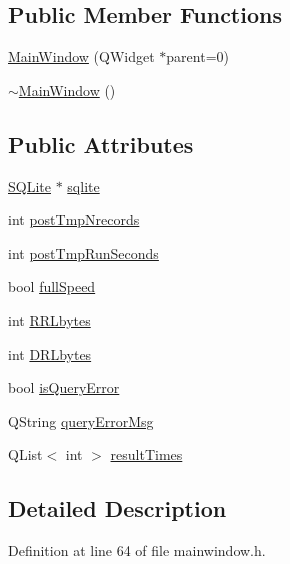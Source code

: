 \subsection*{\-Public \-Member \-Functions}
\begin{DoxyCompactItemize}
\item 
\hyperlink{classMainWindow_a8b244be8b7b7db1b08de2a2acb9409db}{\-Main\-Window} (\-Q\-Widget $\ast$parent=0)
\item 
\hyperlink{classMainWindow_ae98d00a93bc118200eeef9f9bba1dba7}{$\sim$\-Main\-Window} ()
\end{DoxyCompactItemize}
\subsection*{\-Public \-Attributes}
\begin{DoxyCompactItemize}
\item 
\hyperlink{classSQLite}{\-S\-Q\-Lite} $\ast$ \hyperlink{classMainWindow_acd9e528f003b22f3c17657a89505803a}{sqlite}
\item 
int \hyperlink{classMainWindow_a271013fd9b8f471aed5ce6ff2941a6cf}{post\-Tmp\-Nrecords}
\item 
int \hyperlink{classMainWindow_a6c309625ea8d8bd81d552a96ffbbf368}{post\-Tmp\-Run\-Seconds}
\item 
bool \hyperlink{classMainWindow_ac3f3016f1a0ad93767c521c2fd349c7b}{full\-Speed}
\item 
int \hyperlink{classMainWindow_ac4e4dd0ba3dd8b958d2aec2271bfe299}{\-R\-R\-Lbytes}
\item 
int \hyperlink{classMainWindow_af648bf6238ec163343b5dec5e900fc23}{\-D\-R\-Lbytes}
\item 
bool \hyperlink{classMainWindow_a88b9fd4866e9ab0c99f50c7c0801e8de}{is\-Query\-Error}
\item 
\-Q\-String \hyperlink{classMainWindow_afbc3735a35d28cf9ce9a9873aacc4939}{query\-Error\-Msg}
\item 
\-Q\-List$<$ int $>$ \hyperlink{classMainWindow_a69d381f82b82ca37620172b78d58c4ea}{result\-Times}
\end{DoxyCompactItemize}


\subsection{\-Detailed \-Description}


\-Definition at line 64 of file mainwindow.\-h.



